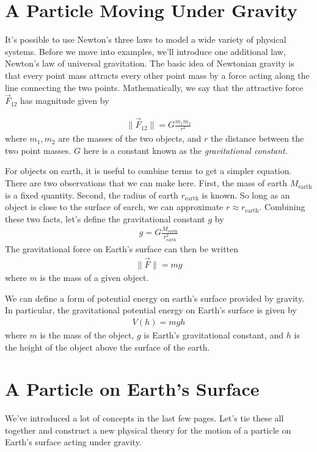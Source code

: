 \documentclass[book.tex]{subfiles}
\begin{document}
\section{A Particle Moving Under Gravity}

It's possible to use Newton's three laws to model a wide variety of physical systems. Before we move into examples, we'll introduce one additional law, Newton's law of universal gravitation. The basic idea of Newtonian gravity is that every point mass attracts every other point mass by a force acting along the line connecting the two points. Mathematically, we say that the attractive force $\vec{F}_{12}$ has magnitude given by

\begin{align}
    \|\vec{F}_{12}\| = G \frac{m_1 m_2}{r^2}
\end{align}
where $m_1, m_2$ are the masses of the two objects, and $r$ the distance between the two point masses. $G$  here is a constant known as the \textit{gravitational constant}. 

For objects on earth, it is useful to combine terms to get a simpler equation. There are two observations that we can make here. First, the mass of earth $M_{\textrm{earth}}$ is a fixed quantity. Second, the radius of earth $r_{\textrm{earth}}$ is known. So long as an object is close to the surface of earch, we can approximate $r \approx r_{\textrm{earth}}$. Combining these two facts, let's define the gravitational constant $g$ by
\begin{align}
    g = G \frac{M_{\textrm{earth}}}{r_{\textrm{earth}}^2}
\end{align}
The gravitational force on Earth's surface can then be written
\begin{align}
    \|\vec{F}\| = mg
\end{align}
where $m$ is the mass of a given object.

We can define a form of potential energy on earth's surface provided by gravity. In particular, the gravitational potential energy on Earth's surface is given by
\begin{align}
    V(h) = mgh
\end{align}
where $m$ is the mass of the object, $g$ is Earth's gravitational constant, and $h$ is the height of the object above the surface of the earth.

\section{A Particle on Earth's Surface}
We've introduced a lot of concepts in the last few pages. Let's tie these all together and construct a new physical theory for the motion of a particle on Earth's surface acting under gravity.
\end{document}
